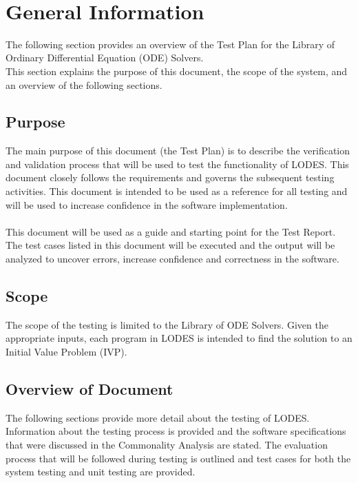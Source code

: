\documentclass[12pt, titlepage]{article}
\newcommand{\famname}{LODES} %
\newcommand{\famdesc}{Library of ODE Solvers}
\begin{document}
~\newpage

\tableofcontents

\listoftables

\listoffigures

\newpage



\section{General Information}
The following section provides an overview of the Test Plan for the Library of Ordinary Differential Equation (ODE) Solvers.\\
This section explains the purpose of this document, the scope of the system, and an overview of the following sections.

\subsection{Purpose}
The main purpose of this document (the Test Plan) is to describe the verification and validation process that will be used to test the
functionality of \famname{}.  This document closely follows the requirements and governs the subsequent testing activities.
This document is intended to be used as a reference for all testing and will be used to increase confidence in the software implementation.\\
\\
This document will be used as a guide and starting point for the Test Report. The test cases
listed in this document will be executed and the output will be analyzed to uncover errors, increase confidence and correctness in the software.

\subsection{Scope}
The scope of the testing is limited to the \famdesc{}. Given the appropriate inputs, each program in \famname{} is intended to find
the solution to an Initial Value Problem (IVP).\\

\subsection{Overview of Document}
The following sections provide more detail about the testing of \famname{}.
Information about the testing process is provided and the software specifications
that were discussed in the Commonality Analysis are stated.
The evaluation process that will be followed during testing is outlined and test cases
for both the system testing and unit testing are provided.
\end{document}
